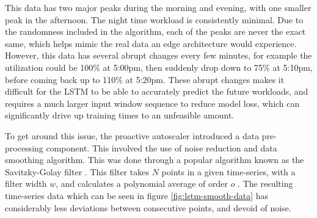 \begin{center}
\begin{minipage}{\linewidth}
    \label{fig:lstm-init-data}
\end{minipage}
\end{center}

This data has two major peaks during the morning and evening, with one smaller peak in the afternoon. The night time workload is consistently minimal. Due to the randomness included in the algorithm, each of the peaks are never the exact same, which helps mimic the real data an edge architecture would experience. However, this data has several abrupt changes every few minutes, for example the utilization could be 100\% at 5:00pm, then suddenly drop down to 75\% at 5:10pm, before coming back up to 110\% at 5:20pm. These abrupt changes makes it difficult for the LSTM to be able to accurately predict the future workloads, and requires a much larger input window sequence to reduce model loss, which can significantly drive up training times to an unfeasible amount.\par

To get around this issue, the proactive autoscaler introduced a data pre-processing component. This involved the use of noise reduction and data smoothing algorithm. This was done through a popular algorithm known as the Savitzky-Golay filter \cite{savitzky1964smoothing}. This filter takes $N$ points in a given time-series, with a filter width $w$, and calculates a polynomial average of order $o$ \cite{schafer2011savitzky}. The resulting time-series data which can be seen in figure \ref{fig:lstm-smooth-data} has considerably less deviations between consecutive points, and devoid of noise.\par

